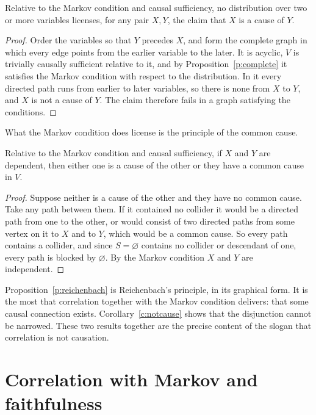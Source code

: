 \documentclass{situationist-preprint}
\begin{document}
\begin{corollary}\label{c:notcause}
Relative to the Markov condition and causal sufficiency, no distribution over two or more variables licenses, for any pair $X, Y$, the claim that $X$ is a cause of $Y$.
\end{corollary}

\begin{proof}
Order the variables so that $Y$ precedes $X$, and form the complete graph in which every edge points from the earlier variable to the later. It is acyclic, $V$ is trivially causally sufficient relative to it, and by Proposition~\ref{p:complete} it satisfies the Markov condition with respect to the distribution. In it every directed path runs from earlier to later variables, so there is none from $X$ to $Y$, and $X$ is not a cause of $Y$. The claim therefore fails in a graph satisfying the conditions.
\end{proof}

What the Markov condition does license is the principle of the common cause.

\begin{proposition}\label{p:reichenbach}
Relative to the Markov condition and causal sufficiency, if $X$ and $Y$ are dependent, then either one is a cause of the other or they have a common cause in $V$.
\end{proposition}

\begin{proof}
Suppose neither is a cause of the other and they have no common cause. Take any path between them. If it contained no collider it would be a directed path from one to the other, or would consist of two directed paths from some vertex on it to $X$ and to $Y$, which would be a common cause. So every path contains a collider, and since $S = \varnothing$ contains no collider or descendant of one, every path is blocked by $\varnothing$. By the Markov condition $X$ and $Y$ are independent.
\end{proof}

Proposition~\ref{p:reichenbach} is Reichenbach's principle, in its graphical form. It is the most that correlation together with the Markov condition delivers: that some causal connection exists. Corollary~\ref{c:notcause} shows that the disjunction cannot be narrowed. These two results together are the precise content of the slogan that correlation is not causation.

\section{Correlation with Markov and faithfulness}\label{s:license}
\end{document}
